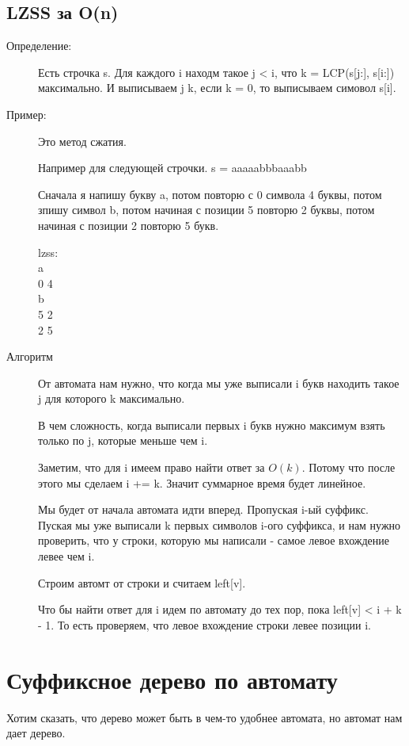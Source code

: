 \subsection{LZSS за O(n)}
    \begin{description}
    
    \item[Определение:] 
    
    Есть строчка s. Для каждого i находм такое j < i,
    что k = LCP(s[j:], s[i:]) максимально. И
    выписываем j k, если k = 0, то выписываем симовол s[i].
   
    \item[Пример:]
    Это метод сжатия. 
    
    Например для следующей строчки.
    s = aaaaabbbaaabb

    Сначала я напишу букву a, потом повторю с 0 символа 4 буквы, 
    потом зпишу символ b, потом начиная с позиции 5 повторю 2
    буквы, потом начиная с позиции 2 повторю 5 букв. 

    lzss:\\
    a\\
    0 4\\
    b\\
    5 2\\
    2 5\\
    

    \item[Алгоритм]
    От автомата нам нужно, что когда мы уже выписали i букв находить 
    такое j для которого k максимально. 
    
    В чем сложность, когда выписали первых i букв нужно 
    максимум взять только по j, которые меньше чем i.
    
    Заметим, что для i имеем право найти ответ за $O(k)$. 
    Потому что после этого мы сделаем i += k. Значит 
    суммарное время будет линейное. 

    Мы будет от начала автомата идти вперед. Пропуская
    i-ый суффикс. Пуская мы уже выписали k первых символов 
    i-ого суффикса, и нам нужно проверить, что 
    у строки, которую мы написали - самое
    левое вхождение левее чем i. 

    Строим автомт от строки и считаем left[v]. 

    Что бы найти ответ для i идем по автомату до тех 
    пор, пока left[v] < i + k - 1. То есть проверяем, 
    что левое вхождение строки левее позиции i.
   
    \end{description}
\section{Суффиксное дерево по автомату}
    Хотим сказать, что дерево может быть в чем-то удобнее автомата, 
    но автомат нам дает дерево. 
    
